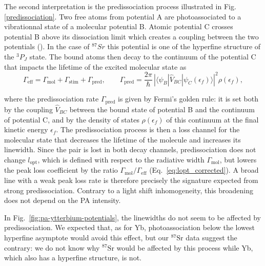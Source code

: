 \begin{itemize}
        The second interpretation is the predissociation process illustrated in Fig.\ref{predissociation}. Two free atoms from potential A are photoassociated to a vibrationnal state of a molecular potential B. Atomic 
        potential C crosses potential B above its dissociation limit which 
        creates a coupling between the two potentials (\cite{mukherjee_feshbach_2022}). In the case of $^{87}Sr$ this potential is one of the hyperfine structure of the $^3P_J$ state. The bound atoms then decay to the 
        continuum of the potential C that impacts the lifetime of the excited
        molecular state as 
        \begin{equation}
            \Gamma_{\text{eff}} = \Gamma_{\text{mol}} + \Gamma_{\text{stim}} + \Gamma_{\text{pred}},
            \qquad
            \Gamma_{\text{pred}} = \frac{2\pi}{\hbar}\,\left|\langle \psi_B | \hat V_{BC} | \psi_C(\epsilon_f)\rangle\right|^2 \rho(\epsilon_f),
        \end{equation}

        where the predissociation rate $\Gamma_{\text{pred}}$ is given by Fermi's golden rule: it is set both by the coupling $\hat V_{BC}$ between the bound state of potential B and the continuum of potential C, and by the density of states $\rho(\epsilon_f)$ of this continuum at the final kinetic energy $\epsilon_f$. The 
        predissociation process is then a loss channel for the molecular state that decreases the lifetime of the molecule and increases its linewidth. Since the pair is lost in both decay channels, predissociation does not change $l_{\text{opt}}$, which is defined with respect to the radiative width $\Gamma_{\text{mol}}$, but lowers the peak loss coefficient by the ratio $\Gamma_{\text{mol}}/\Gamma_{\text{eff}}$ (Eq.~\ref{eq:lopt_corrected}). A broad line with a weak peak loss rate is therefore precisely the signature expected from strong predissociation. Contrary to a light shift inhomogeneity, this broadening does not depend on the PA intensity. 

        In Fig.~\ref{fig:pa-ytterbium-potentials}, the linewidths do not seem to be affected by predissociation. We expected that, as for Yb,
        photoassociation below the lowest hyperfine asymptote would avoid this effect, but our $^{87}\text{Sr}$ data suggest the contrary: we do not know why
        $^{87}\text{Sr}$ would be affected by this process while Yb, which also has a hyperfine structure, is not.
        

\end{itemize}
